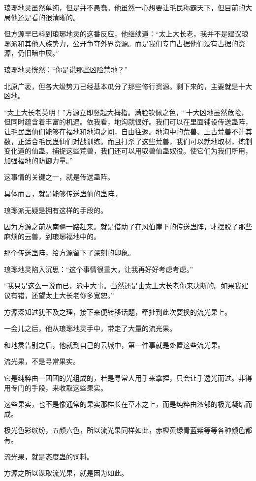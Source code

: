 \begin{this_body}
琅琊地灵虽然单纯，但是并不愚蠢。他虽然一心想要让毛民称霸天下，但目前的大局他还是看的很清晰的。

但方源早已料到琅琊地灵的这番反应，他继续道：“太上大长老，我并不是建议琅琊派和其他人族势力，公开争夺外界资源。而是我们专门占据他们没有占据的资源，仍旧暗中展。”

琅琊地灵恍然：“你是说那些凶险禁地？”

北原广袤，但各大级势力已经基本瓜分了那些修行资源。剩下来的，主要就是十大凶地。

“太上大长老英明！”方源立即竖起大拇指。满脸钦佩之色，“十大凶地虽然危险，但同时蕴含着丰富的机遇。依我看，地沟就很好。我们可以在里面铺设传送蛊阵，让毛民蛊仙们能够在福地和地沟之间，自由往返。地沟中的荒兽、上古荒兽不计其数，正适合毛民蛊仙们对战训练。而且打杀了这些荒兽，我们可以就地取材，炼制变化道的仙蛊。捕捉这些荒兽，我们还可以用驭兽仙蛊奴役。使它们为我们所用，加强福地的防御力量。”

这事情的关键之一，就是传送蛊阵。

具体而言，就是能够传送蛊仙的蛊阵。

琅琊派无疑是拥有这样的手段的。

因为方源之前从南疆一路赶来。就是借助了在风伯崖下的传送蛊阵，才摆脱了那些麻烦的云兽，到琅琊福地中的。

那个传送蛊阵，给方源留下了深刻的印象。

琅琊地灵陷入沉思：“这个事情很重大，让我再好好考虑考虑。”

“我只是这么一说而已，派中大事。当然还是由太上大长老你来决断的。如果我建议有错，还望太上大长老你多宽恕。”

方源深知过犹不及之理，接下来便转移话题，牵扯到此次要换的流光果上。

一会儿之后，他从琅琊地灵手中，带走了大量的流光果。

和地灵告别之后，他就到自己的云城中，第一件事就是处置这些流光果。

流光果，不是寻常果实。

它是纯粹由一团团的光组成的，若是寻常人用手来拿捏，只会让手透光而过。非得用专门的手段，来收取这些果实。

这些果实，也不是像通常的果实那样长在草木之上，而是纯粹由浓郁的极光凝结而成。

极光色彩缤纷，五颜六色，所以流光果同样如此，赤橙黄绿青蓝紫等等各种颜色都有。

流光果，就是态度蛊的饲料。

方源之所以谋取流光果，就是因为如此。


\end{this_body}
